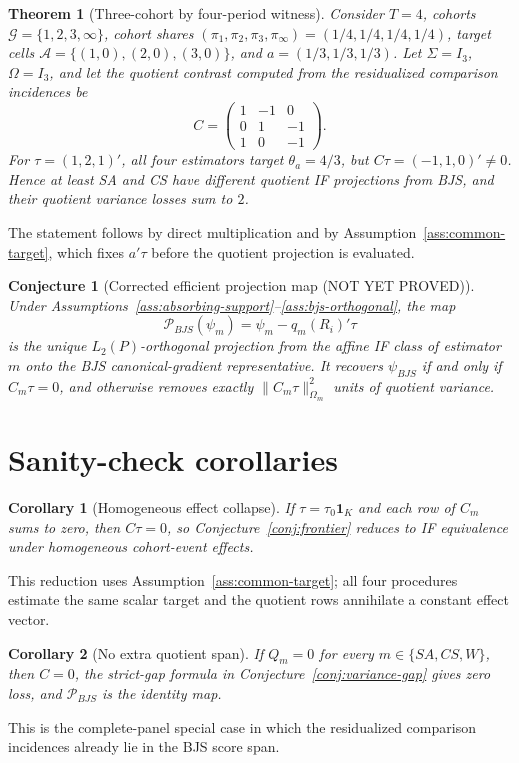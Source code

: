 \documentclass[11pt]{article}
\theoremstyle{definition}
\theoremstyle{plain}
\newtheorem{theorem}{Theorem}
\newtheorem{conjecture}{Conjecture}
\newtheorem{corollary}{Corollary}
\theoremstyle{remark}
\begin{document}
\begin{theorem}[Three-cohort by four-period witness]\label{thm:witness}
Consider \(T=4\), cohorts \(\mathcal G=\{1,2,3,\infty\}\), cohort shares \((\pi_1,\pi_2,\pi_3,\pi_\infty)=(1/4,1/4,1/4,1/4)\), target cells \(\mathcal A=\{(1,0),(2,0),(3,0)\}\), and \(a=(1/3,1/3,1/3)\). Let \(\Sigma=I_3\), \(\Omega=I_3\), and let the quotient contrast computed from the residualized comparison incidences be
\[
  C=\begin{pmatrix}
  1&-1&0\\
  0&1&-1\\
  1&0&-1
  \end{pmatrix}.
\]
For \(\tau=(1,2,1)'\), all four estimators target \(\theta_a=4/3\), but \(C\tau=(-1,1,0)'\ne0\). Hence at least SA and CS have different quotient IF projections from BJS, and their quotient variance losses sum to \(2\).
\end{theorem}
The statement follows by direct multiplication and by Assumption~\ref{ass:common-target}, which fixes \(a'\tau\) before the quotient projection is evaluated.

\begin{conjecture}[Corrected efficient projection map (NOT YET PROVED)]\label{conj:projection-map}
Under Assumptions~\ref{ass:absorbing-support}--\ref{ass:bjs-orthogonal}, the map
\[
  \mathcal P_{BJS}(\psi_m)=\psi_m-q_m(R_i)'\tau
\]
is the unique \(L_2(P)\)-orthogonal projection from the affine IF class of estimator \(m\) onto the BJS canonical-gradient representative. It recovers \(\psi_{BJS}\) if and only if \(C_m\tau=0\), and otherwise removes exactly \(\|C_m\tau\|^2_{\Omega_m}\) units of quotient variance.
\end{conjecture}

\section{Sanity-check corollaries}
\begin{corollary}[Homogeneous effect collapse]\label{cor:homogeneous}
If \(\tau=\tau_0\mathbf 1_K\) and each row of \(C_m\) sums to zero, then \(C\tau=0\), so Conjecture~\ref{conj:frontier} reduces to IF equivalence under homogeneous cohort-event effects.
\end{corollary}
This reduction uses Assumption~\ref{ass:common-target}; all four procedures estimate the same scalar target and the quotient rows annihilate a constant effect vector.

\begin{corollary}[No extra quotient span]\label{cor:no-quotient}
If \(Q_m=0\) for every \(m\in\{SA,CS,W\}\), then \(C=0\), the strict-gap formula in Conjecture~\ref{conj:variance-gap} gives zero loss, and \(\mathcal P_{BJS}\) is the identity map.
\end{corollary}
This is the complete-panel special case in which the residualized comparison incidences already lie in the BJS score span.
\end{document}
